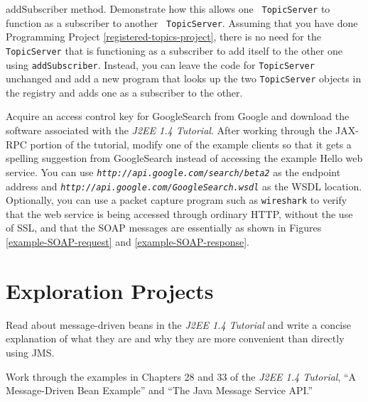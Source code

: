 \begin{chapterEnumerate}
{  addSubscriber} method.  Demonstrate how this allows one {\tt
  TopicServer} to function as a subscriber to another {\tt
  TopicServer}.  Assuming that you have done Programming Project \ref{registered-topics-project}, there is no need for the \texttt{TopicServer} that is functioning as a subscriber to add itself to the other one using \texttt{addSubscriber}.  Instead, you can leave the code for \texttt{TopicServer} unchanged and add a new program that looks up the two \texttt{TopicServer} objects in the registry and adds one as a subscriber to the other.
\item\label{jax-rpc-project}
Acquire an access control key for GoogleSearch from Google and
download the software associated with the \textit{J2EE 1.4 Tutorial}.  After
working through the JAX-RPC portion of the tutorial, modify one of the
example clients so that it gets a spelling suggestion
from GoogleSearch instead of accessing the example Hello web service.
You can use \textit{\nolinkurl{http://api.google.com/search/beta2}} as the endpoint
address and \textit{\nolinkurl{http://api.google.com/GoogleSearch.wsdl}} as the WSDL
location.  Optionally, you can use a packet capture program such as
{\tt wireshark} to verify that the web service is being accessed through
ordinary HTTP, without the use of SSL, and that the SOAP messages are
essentially as shown in Figures \ref{example-SOAP-request} and
\ref{example-SOAP-response}.
\end{chapterEnumerate}

\section*{Exploration Projects}
\begin{chapterEnumerate}
\item
Read about message-driven beans in the \textit{J2EE 1.4 Tutorial} and write a
concise explanation of what they are and why they are more convenient
than directly using JMS.
\item
Work through the examples in Chapters 28 and 33 of the
\textit{J2EE 1.4 Tutorial}, ``A Message-Driven Bean Example'' and
``The Java Message Service API.''
\end{chapterEnumerate}


